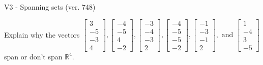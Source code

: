 \begin{exercise}
  \begin{exerciseTitle}V3 - Spanning sets (ver. 748)\end{exerciseTitle}
  \begin{exerciseStatement}
    Explain why the vectors \(\left[\begin{array}{r}
3 \\
-5 \\
-3 \\
4
\end{array}\right] , \left[\begin{array}{r}
-4 \\
-5 \\
4 \\
-2
\end{array}\right] , \left[\begin{array}{r}
-3 \\
-4 \\
-3 \\
2
\end{array}\right] , \left[\begin{array}{r}
-4 \\
-5 \\
-5 \\
-2
\end{array}\right] , \left[\begin{array}{r}
-1 \\
-3 \\
-1 \\
2
\end{array}\right] , \text{ and } \left[\begin{array}{r}
1 \\
-4 \\
3 \\
-5
\end{array}\right]\) span or don't span \(\mathbb{R}^4\). 
	



\end{exerciseStatement}
\end{exercise}
